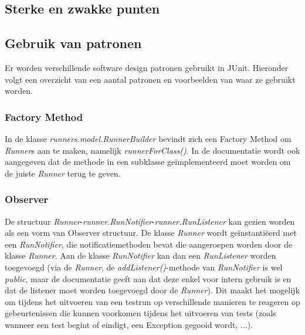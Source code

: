 \documentclass[i1]{oss}
\begin{document}

\subsection{Sterke en zwakke punten}

\subsection{Gebruik van patronen}

Er worden verschillende software design patronen gebruikt in JUnit. 
Hieronder volgt een overzicht van een aantal patronen en voorbeelden van waar ze gebruikt worden.

\subsubsection{Factory Method}
In de klasse \emph{runners.model.RunnerBuilder} bevindt zich een Factory Method om \emph{Runner}s aan te maken, namelijk \emph{runnerForClass()}. 
In de documentatie wordt ook aangegeven dat de methode in een subklasse ge\"implementeerd moet worden om de juiste \emph{Runner} terug te geven.

\subsubsection{Observer}
De structuur \emph{Runner}-\emph{runner.RunNotifier}-\emph{runner.RunListener} kan gezien worden als een vorm van Observer structuur. 
De klasse \emph{Runner} wordt ge\"instanti\"eerd met een \emph{RunNotifier}, die notificatiemethoden bevat die aangeroepen worden door de klasse \emph{Runner}. 
Aan de klasse \emph{RunNotifier} kan dan een \emph{RunListener} worden toegevoegd (via de \emph{Runner}, de \emph{addListener()}-methode van \emph{RunNotifier} is wel \emph{public}, maar de documentatie geeft aan dat deze enkel voor intern gebruik is en dat de listener moet worden toegevoegd door de \emph{Runner}). 
Dit maakt het mogelijk om tijdens het uitvoeren van een testrun op verschillende manieren te reageren op gebeurtenissen die kunnen voorkomen tijdens het uitvoeren van tests (zoals wanneer een test begint of eindigt, een Exception gegooid wordt, ...).
\end{document}
